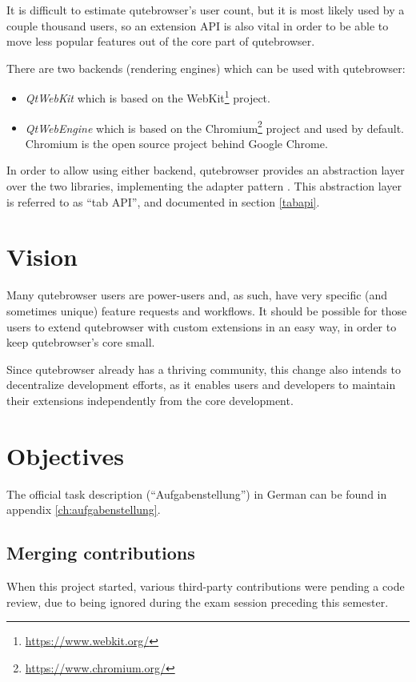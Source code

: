 It is difficult to estimate qutebrowser's user count, but it is most likely used by a
couple thousand users, so an extension API is also vital in order to be able to move
less popular features out of the core part of qutebrowser.

\label{backends}
There are two backends (rendering engines) which can be used with qutebrowser:

\begin{itemize}
  \item \emph{QtWebKit} which is based on the
  WebKit\footnote{\url{https://www.webkit.org/}} project.
  \item \emph{QtWebEngine} which is based on the
  Chromium\footnote{\url{https://www.chromium.org/}} project and used by
  default. Chromium is the open source project behind Google Chrome.
\end{itemize}

In order to allow using either backend, qutebrowser provides an abstraction
layer over the two libraries, implementing the adapter pattern
\autocite[139ff]{gof}. This abstraction layer is referred to as ``tab API'', and
documented in section \ref{tabapi}.

\section{Vision}
\label{vision}

Many qutebrowser users are power-users and, as such, have very specific (and
sometimes unique) feature requests and workflows. It should be possible for
those users to extend qutebrowser with custom extensions in an easy way, in order
to keep qutebrowser's core small.

Since qutebrowser already has a thriving community, this change also intends to
decentralize development efforts, as it enables users and developers to maintain
their extensions independently from the core development.

\section{Objectives}
\label{goals}

The official task description (``Aufgabenstellung'') in German can be found in
appendix \ref{ch:aufgabenstellung}.

\subsection{Merging contributions}
When this project started, various third-party contributions were pending a code
review, due to being ignored during the exam session preceding this semester.

